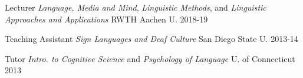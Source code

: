 



\begin{cvhonors}

\iffalse %
\cvhonor
  {Bolded Position}
  {Full Description}
  {Right just Location}
  {YEAR}
\fi

\cvhonor
  {Lecturer}
  {\textit{Language, Media and Mind}, \textit{Linguistic Methods}, and \textit{Linguistic Approaches and Applications}}
  {RWTH Aachen U.}
  {2018-19}

\cvhonor
  {Teaching Assistant}
  {\textit{Sign Languages and Deaf Culture}}
  {San Diego State U.}
  {2013-14}

\cvhonor
  {Tutor}
  {\textit{Intro. to Cognitive Science} and \textit{Psychology of Language}}
  {U. of Connecticut}
  {2013}

\end{cvhonors}